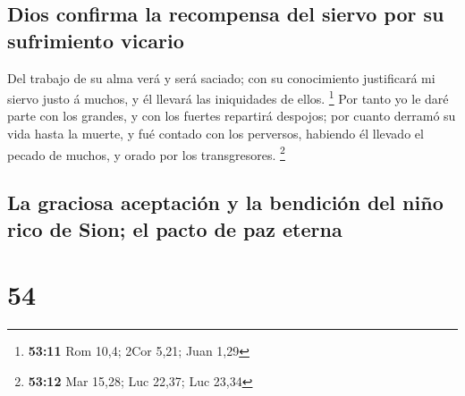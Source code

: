 \hypertarget{dios-confirma-la-recompensa-del-siervo-por-su-sufrimiento-vicario}{%
\subsection{Dios confirma la recompensa del siervo por su sufrimiento
vicario}\label{dios-confirma-la-recompensa-del-siervo-por-su-sufrimiento-vicario}}

 Del trabajo de su alma verá y será saciado; con su
conocimiento justificará mi siervo justo á muchos, y él llevará las
iniquidades de ellos. \footnote{\textbf{53:11} Rom 10,4; 2Cor 5,21; Juan
  1,29}  Por tanto yo le daré parte con los grandes, y con
los fuertes repartirá despojos; por cuanto derramó su vida hasta la
muerte, y fué contado con los perversos, habiendo él llevado el pecado
de muchos, y orado por los transgresores. \footnote{\textbf{53:12} Mar
  15,28; Luc 22,37; Luc 23,34}

\hypertarget{la-graciosa-aceptaciuxf3n-y-la-bendiciuxf3n-del-niuxf1o-rico-de-sion-el-pacto-de-paz-eterna}{%
\subsection{La graciosa aceptación y la bendición del niño rico de Sion;
el pacto de paz
eterna}\label{la-graciosa-aceptaciuxf3n-y-la-bendiciuxf3n-del-niuxf1o-rico-de-sion-el-pacto-de-paz-eterna}}

\hypertarget{section-53}{%
\section{54}\label{section-53}}

